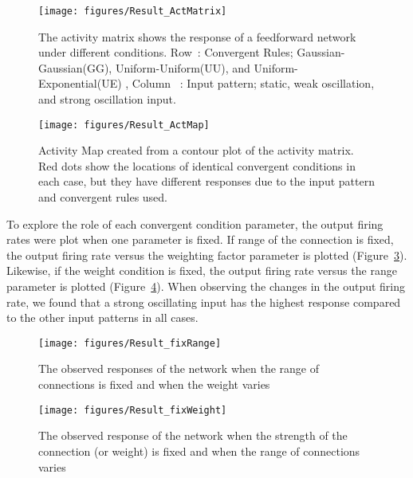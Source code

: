 \begin{figure}[!h]
	\centering
	\texttt{[image: figures/Result\_ActMatrix]}
	\caption{The activity matrix shows the response of a feedforward network under different conditions. Row~: Convergent Rules; Gaussian-Gaussian(GG), Uniform-Uniform(UU), and Uniform-Exponential(UE) , Column ~: Input pattern; static, weak oscillation, and strong oscillation input.}
	\label{fig:ActivityMatrix}
\end{figure}

\begin{figure}[!h]
	\centering
	\texttt{[image: figures/Result\_ActMap]}
	\caption{Activity Map created from a contour plot of the activity matrix. Red dots show the locations of identical convergent conditions in each case, but they have different responses due to the input pattern and convergent rules used.}
	\label{fig:ActivityMap}
\end{figure}


 To explore the role of each convergent condition parameter, the output firing rates were plot when one parameter is fixed. If range of the connection is fixed, the output firing rate versus the weighting factor parameter is plotted (Figure~\ref{fig:ObservedRfix}). Likewise, if the weight condition is fixed, the output firing rate versus the range parameter is plotted (Figure~\ref{fig:ObservedWfix}). 
When observing the changes in the output firing rate, we found that a strong oscillating input has the highest response compared to the other input patterns in all cases. 


\begin{figure}[!h]
	\centering
	\texttt{[image: figures/Result\_fixRange]}
	\caption{The observed responses of the network when the range of connections is fixed and when the weight varies}
	\label{fig:ObservedRfix}
\end{figure}

\begin{figure}[!h]
	\centering
	\texttt{[image: figures/Result\_fixWeight]}
	\caption{The observed response of the network when the strength of the connection (or weight) is fixed and when the range of connections varies}
	\label{fig:ObservedWfix}
\end{figure}

